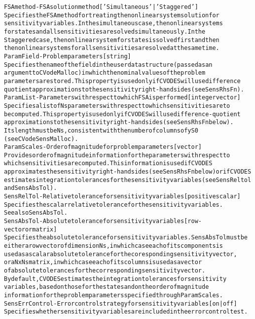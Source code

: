 \begin{alltt}
FSAmethod - FSA solution method [ 'Simultaneous' | {'Staggered'} ]
   Specifies the FSA method for treating the nonlinear system solution for
   sensitivity variables. In the simultaneous case, the nonlinear systems
   for states and all sensitivities are solved simultaneously. In the
   Staggered case, the nonlinear system for states is solved first and then
   the nonlinear systems for all sensitivities are solved at the same time.
ParamField - Problem parameters  [ string ]
   Specifies the name of the field in the user data structure (passed as an
   argument to CVodeMalloc) in which the nominal values of the problem
   parameters are stored. This property is used only if  CVODES will use difference
   quotient approximations to the sensitivity right-hand sides (see SensRhsFn).
ParamList - Parameters with respect to which FSA is performed [ integer vector ]
   Specifies a list of Ns parameters with respect to which sensitivities are to
   be computed. This property is used only if CVODES will use difference-quotient
   approximations to the sensitivity right-hand sides (see SensRhsFn below).
   Its length must be Ns, consistent with the number of columns of yS0
   (see CVodeSensMalloc).
ParamScales - Order of magnitude for problem parameters [ vector ]
   Provides order of magnitude information for the parameters with respect to
   which sensitivities are computed. This information is used if CVODES
   approximates the sensitivity right-hand sides (see SensRhsFn below) or if CVODES
   estimates integration tolerances for the sensitivity variables (see SensReltol
   and SensAbsTol).
SensRelTol - Relative tolerance for sensitivity variables [ positive scalar ]
   Specifies the scalar relative tolerance for the sensitivity variables.
   See also SensAbsTol.
SensAbsTol - Absolute tolerance for sensitivity variables [ row-vector or matrix ]
   Specifies the absolute tolerance for sensitivity variables. SensAbsTol must be
   either a row vector of dimension Ns, in which case each of its components is
   used as a scalar absolute tolerance for the coresponding sensitivity vector,
   or a N x Ns matrix, in which case each of its columns is used as a vector
   of absolute tolerances for the corresponding sensitivity vector.
   By default, CVODES estimates the integration tolerances for sensitivity
   variables, based on those for the states and on the order of magnitude
   information for the problem parameters specified through ParamScales.
SensErrControl - Error control strategy for sensitivity variables [ on | {off} ]
   Specifies whether sensitivity variables are included in the error control test.

\end{alltt}
